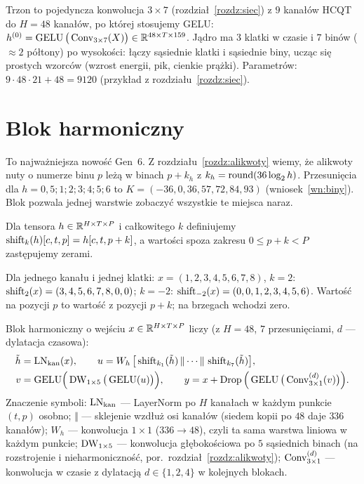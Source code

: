 Trzon to pojedyncza konwolucja $3\times7$ (rozdział~\ref{rozdz:siec}) z $9$ kanałów HCQT do $H=48$ kanałów, po której stosujemy GELU:
$h^{(0)}=\operatorname{GELU}\big(\operatorname{Conv}_{3\times7}(X)\big)\in\mathbb{R}^{48\times T\times159}$. Jądro ma $3$ klatki w czasie i $7$ binów ($\approx2$ półtony) po wysokości: łączy sąsiednie klatki i sąsiednie biny, ucząc się prostych wzorców (wzrost energii, pik, cienkie prążki).
Parametrów: $9\cdot48\cdot21+48=9120$ (przykład z rozdziału~\ref{rozdz:siec}).

\section{Blok harmoniczny}

To najważniejsza nowość Gen~6. Z rozdziału~\ref{rozdz:alikwoty} wiemy, że alikwoty nuty o numerze binu $p$ leżą w binach $p+k_h$ z $k_h=\operatorname{round}(36\log_2h)$. Przesunięcia dla $h=0{,}5;1;2;3;4;5;6$ to
$K=(-36,0,36,57,72,84,93)$ (wniosek~\ref{wn:biny}). Blok pozwala jednej warstwie zobaczyć wszystkie te miejsca naraz.

\begin{definicja}\label{def:shift}
Dla tensora $h\in\mathbb{R}^{H\times T\times P}$ i całkowitego $k$ definiujemy $\operatorname{shift}_k(h)[c,t,p]=h[c,t,p+k]$, a wartości spoza zakresu $0\le p+k<P$ zastępujemy zerami.
\end{definicja}

\begin{przyklad}\label{prz:shift}
Dla jednego kanału i jednej klatki: $x=(1,2,3,4,5,6,7,8)$, $k=2$: $\operatorname{shift}_2(x)=(3,4,5,6,7,8,0,0)$; $k=-2$: $\operatorname{shift}_{-2}(x)=(0,0,1,2,3,4,5,6)$. Wartość na pozycji $p$ to wartość z pozycji $p+k$; na brzegach wchodzi zero.
\end{przyklad}

Blok harmoniczny o wejściu $x\in\mathbb{R}^{H\times T\times P}$ liczy (z $H=48$, $7$ przesunięciami, $d$ --- dylatacja czasowa):
\begin{align}
\tilde h &= \operatorname{LN}_\mathrm{kan}(x), \qquad u=W_h\,\big[\operatorname{shift}_{k_1}(\tilde h)\,\Vert\cdots\Vert\,\operatorname{shift}_{k_7}(\tilde h)\big],\\
v &= \operatorname{GELU}\!\Big(\operatorname{DW}_{1\times5}\big(\operatorname{GELU}(u)\big)\Big), \qquad
y=x+\operatorname{Drop}\Big(\operatorname{GELU}\big(\operatorname{Conv}^{(d)}_{3\times1}(v)\big)\Big).
\end{align}
Znaczenie symboli: $\operatorname{LN}_\mathrm{kan}$ --- LayerNorm po $H$ kanałach w każdym punkcie $(t,p)$ osobno; $\Vert$ --- sklejenie wzdłuż osi kanałów (siedem kopii po $48$ daje $336$ kanałów); $W_h$ --- konwolucja $1\times1$ ($336\to48$), czyli ta sama warstwa liniowa w każdym punkcie;
$\operatorname{DW}_{1\times5}$ --- konwolucja głębokościowa po $5$ sąsiednich binach (na rozstrojenie i nieharmoniczność, por.\ rozdział~\ref{rozdz:alikwoty}); $\operatorname{Conv}^{(d)}_{3\times1}$ --- konwolucja w czasie z dylatacją $d\in\{1,2,4\}$ w kolejnych blokach.

